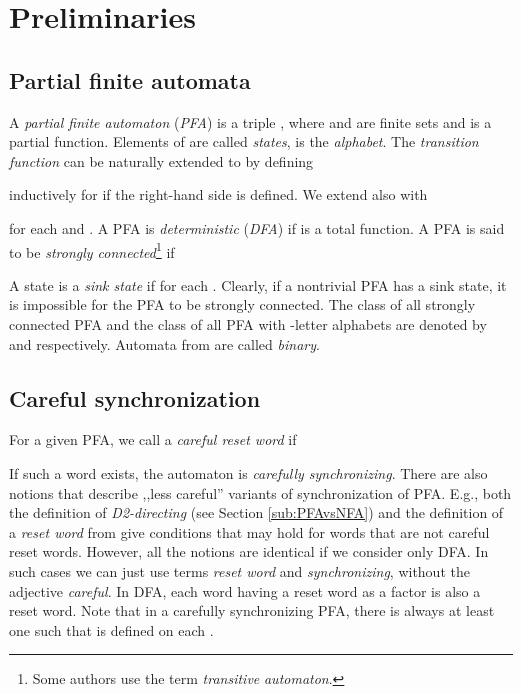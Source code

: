 \documentclass{ws-ijmpc}
\begin{document}
\section{Preliminaries\label{sec:Preliminaries}}


\subsection{Partial finite automata}

A \emph{partial finite automaton }(\emph{PFA})\emph{ }is a triple
, where  and  are finite sets
and  is a partial function. Elements
of  are called \emph{states},  is the \emph{alphabet}. The
\emph{transition function}  can be naturally extended to
 by defining

inductively for  if the right-hand side is
defined. We extend  also with

for each  and . A PFA is \emph{deterministic}
(\emph{DFA}) if  is a total function. A PFA 
is said to be \emph{strongly connected}\footnote{Some authors use the term \emph{transitive} \emph{automaton}.}\emph{ }if

A state  is a \emph{sink state }if 
for each . Clearly, if a nontrivial PFA has a sink state,
it is impossible for the PFA to be strongly connected. The class of
all strongly connected PFA and the class of all PFA with -letter
alphabets are denoted by  and  respectively.
Automata from  are called \emph{binary}.


\subsection{Careful synchronization}

For a given PFA, we call  a \emph{careful reset word}
if

If such a word exists, the automaton is \emph{carefully synchronizing}.
There are also notions that describe ,,less careful'' variants of
synchronization of PFA. E.g., both the definition of \emph{D2-directing}
(see Section \ref{sub:PFAvsNFA}) and the definition of a \emph{reset
word }from \citep{BER6} give conditions that may hold for words that
are not careful reset words. However, all the notions are identical
if we consider only DFA. In such cases we can just use terms \emph{reset
word} and \emph{synchronizing}, without the adjective \emph{careful}.
In DFA, each word having a reset word as a factor is also a reset
word. Note that in a carefully synchronizing PFA, there is always
at least one  such that  is defined
on each .
\end{document}
